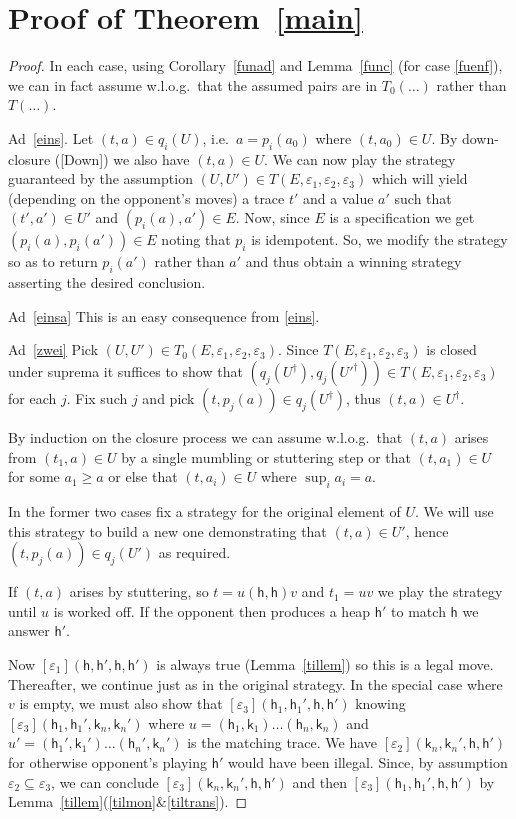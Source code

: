 \documentclass[nocopyrightspace,preprint]{sigplanconf}
\newcommand{\eff}{\varepsilon}
\newcommand\heap{\ensuremath{\mathsf{h}}\xspace}
\newcommand\h{\heap}
\renewcommand\k{\ensuremath{\mathsf{k}}\xspace}
\begin{document}
\appendix

\section{Proof of Theorem~\ref{main}}

\begin{proof}
In each case, using Corollary~\ref{funad} and Lemma~\ref{func} (for
case \ref{fuenf}), we can in fact assume w.l.o.g.\ that the assumed
pairs are in $T_0(\dots)$ rather than $T(\dots)$. 

\medskip 

 Ad~\ref{eins}.  Let $(t,a)\in q_i(U)$, i.e.\ $a=p_i(a_0)$ where
 $(t,a_0)\in U$.  By down-closure ([Down]) we also have $(t,a)\in
 U$. We can now play the strategy guaranteed by the assumption
 $(U,U')\in T(E,\eff_1,\eff_2,\eff_3)$ which will yield (depending
 on the opponent's moves) a trace $t'$ and a value $a'$ such that
 $(t',a')\in U'$ and $(p_i(a),a')\in E$. Now, since $E$ is a
 specification we get $(p_i(a),p_i(a'))\in E$ noting that $p_i$ is
 idempotent. So, we modify the strategy so as to return $p_i(a')$
 rather than $a'$ and thus obtain a winning strategy asserting the
 desired conclusion.

Ad~\ref{einsa} This is an easy consequence from \ref{eins}. 

Ad~\ref{zwei} Pick $(U,U')\in
T_0(E,\eff_1,\eff_2,\eff_3)$. Since $T(E,\eff_1,\eff_2,\eff_3)$ is
closed under suprema it suffices to show that
$(q_j(U^\dagger),q_j({U'}^\dagger))\in T(E,\eff_1,\eff_2,\eff_3)$ for
  each $j$. Fix such $j$ and pick $(t,p_j(a))\in q_j(U^\dagger)$, thus
  $(t,a)\in U^\dagger$. 


By induction on the closure process we can assume w.l.o.g.\ that $(t,a)$
arises from $(t_1,a)\in U$ by a single mumbling or stuttering step
or that $(t,a_1)\in U$ for some $a_1\geq a$ or else that $(t,a_i)\in
U$ where $\sup_i a_i=a$. 

In the former two cases fix a strategy for the original element of
$U$. We will use this strategy to build a new one demonstrating that $(t,a)\in U'$, hence $(t,p_j(a))\in q_j(U')$ as required.  


If $(t,a)$ arises by stuttering, so $t=u(\h,\h)v$ and $t_1=uv$ we play
the strategy until $u$ is worked off. If the opponent then produces a
heap $\heap'$ to match $\heap$ we answer $\heap'$.

\smallskip 

Now $[\eff_1](\h,\h',\h,\h')$ is always true (Lemma~\ref{tillem}) so this is
a legal move. Thereafter, we continue just as in the original
strategy. In the special case where $v$ is empty, we must also show
that $[\eff_3](\h_1,\h_1',\h,\h')$ knowing $[\eff_3](\h_1,\h_1',\k_n,\k_n')$ 
where $u=(\h_1,\k_1)\dots(\h_n,\k_n)$ and $u'=(\h_1',\k_1')\dots(\h_n',\k_n')$ is the matching trace. We have $[\eff_2](\k_n,\k_n',\h,\h')$ for otherwise opponent's playing $\h'$ would have been illegal. Since, by assumption $\eff_2\subseteq\eff_3$, we can conclude $[\eff_3](\k_n,\k_n',\h,\h')$ and then $[\eff_3](\h_1,\h_1',\h,\h')$ by Lemma~\ref{tillem}(\ref{tilmon}\&\ref{tiltrans}). 


\end{proof}
\end{document}
